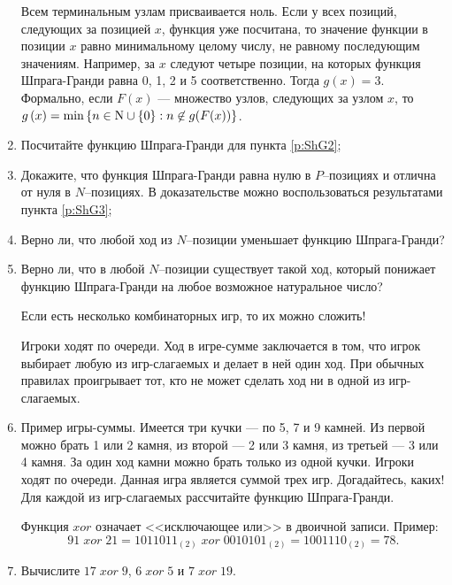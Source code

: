 \begin{problem}
\begin{enumerate}
Всем терминальным узлам присваивается ноль.
Если у всех позиций, следующих за позицией  $x$, функция уже посчитана, то значение функции в позиции  $x$  равно минимальному целому числу, не равному последующим значениям.
Например, за  $x$  следуют четыре позиции, на которых функция Шпрага-Гранди равна 0, 1, 2 и 5 соответственно. Тогда  $g\left(x\right)=3$. Формально, если  $F\left(x\right)$  --- множество узлов, следующих за узлом  $x$, то  $g\left(x\right)=\min \left\{n\in {\rm N} \cup \left\{0\right\}: n \not \in g(F(x))\right\}$.
\item	Посчитайте функцию Шпрага-Гранди для пункта \ref{p:ShG2};\par
\item	Докажите, что функция Шпрага-Гранди равна нулю в  $P$--позициях и отлична от нуля в  $N$--позициях. В доказательстве можно воспользоваться результатами пункта \ref{p:ShG3};\par
\item	Верно ли, что любой ход из  $N$--позиции уменьшает функцию Шпрага-Гранди?\par
\item	Верно ли, что в любой  $N$--позиции существует такой ход, который понижает функцию Шпрага-Гранди на любое возможное натуральное число?\par
Если есть несколько комбинаторных игр, то их можно сложить! \par
Игроки ходят по очереди. Ход в игре-сумме заключается в том, что игрок выбирает любую из игр-слагаемых и делает в ней один ход. При обычных правилах проигрывает тот, кто не может сделать ход ни в одной из игр-слагаемых.\par
\item\label{p:ShG7}	Пример игры-суммы. Имеется три кучки --- по 5, 7 и 9 камней. Из первой можно брать 1 или 2 камня, из второй --- 2 или 3 камня, из третьей --- 3 или 4 камня. За один ход камни можно брать только из одной кучки. Игроки ходят по очереди. Данная игра является суммой трех игр. Догадайтесь, каких! Для каждой из игр-слагаемых рассчитайте функцию Шпрага-Гранди.\par
Функция  $xor$  означает <<исключающее или>> в двоичной записи. Пример:
\[91\; xor\; 21=1011011_{\left(2\right)} \; xor\; 0010101_{\left(2\right)} =1001110_{\left(2\right)} =78.\]
\item	Вычислите  $17\; xor\; 9$,  $6\; xor\; 5$  и  $7\; xor\; 19.$ \par


\end{enumerate}
\end{problem}

